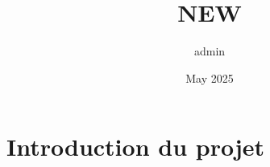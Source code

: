 \documentclass{article}
\title{NEW}
\author{admin }
\date{May 2025}
\begin{document}
\maketitle

\section{Introduction du projet}
\end{document}
